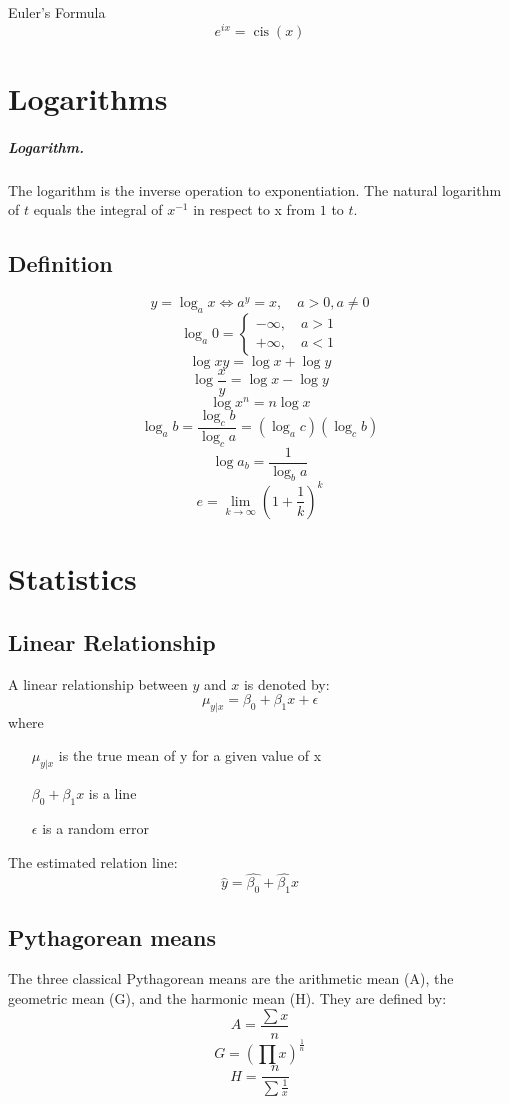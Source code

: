 \documentclass[oneside]{book} %
\theoremstyle{plain}
\DeclareMathOperator\cis{cis} %
\newcommand*\reciprocal[1]{\frac{1}{#1}}
\begin{document}
Euler's Formula
\[e^{ix} = \cis \left ( x \right)\]

\chapter{Logarithms}

\paragraph{Logarithm.} The logarithm is the inverse operation to exponentiation.
The natural logarithm of \(t\) equals the integral of \(x^{-1}\) in respect to x
from \(1\) to \(t\).

\section{Definition}

\[y = \log_a x \iff a^y = x, \quad a > 0, a \ne 0\]
\[\log_a 0 = \begin{cases} -\infty, \quad a > 1 \\ +\infty, \quad a < 1
\end{cases}\]
\[\log x y = \log x + \log y\]
\[\log \frac{x}{y} = \log x - \log y\]
\[\log x^n = n \log x\]
\[\log_a b = \frac{\log_c b}{\log_c a} = \left ( \log_a c \right ) \left (
\log_c b \right )\]
\[\log a_b = \reciprocal{\log_b a}\]
\[e=\lim_{k\to\infty} \left ( 1 + \reciprocal{k} \right ) ^ k\]

\chapter{Statistics}

\section{Linear Relationship}
A linear relationship between \(y\) and \(x\) is denoted by:
\[\mu_{y | x} = \beta_0 + \beta_1 x + \epsilon\]
where
\begin{itemize}
  \item[\(\mu_{y | x}\)] is the true mean of y for a given value of x
  \item[\(\beta_0 + \beta_1 x\)] is a line
  \item[\(\epsilon\)] is a random error
\end{itemize}

The estimated relation line:
\[\hat y = \hat {\beta_0} + \hat {\beta_1} x\]

\section{Pythagorean means}
The three classical Pythagorean means are the arithmetic mean (A), the
geometric mean (G), and the harmonic mean (H). They are defined by:
\[A = \frac{\sum{x}}{n}\]
\[G = \left( \prod{x} \right) ^ \reciprocal{n}\]
\[H = \frac{n}{\sum{\reciprocal{x}}}\]
\end{document}
